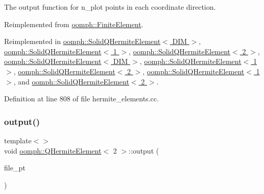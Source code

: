 The output function for n\+\_\+plot points in each coordinate direction. 



Reimplemented from \hyperlink{classoomph_1_1FiniteElement_afa9d9b2670f999b43e6679c9dd28c457}{oomph\+::\+Finite\+Element}.



Reimplemented in \hyperlink{classoomph_1_1SolidQHermiteElement_ade1e06d5bf37699c512cd91c013dd1e9}{oomph\+::\+Solid\+Q\+Hermite\+Element$<$ D\+I\+M $>$}, \hyperlink{classoomph_1_1SolidQHermiteElement_ade1e06d5bf37699c512cd91c013dd1e9}{oomph\+::\+Solid\+Q\+Hermite\+Element$<$ 1 $>$}, \hyperlink{classoomph_1_1SolidQHermiteElement_ade1e06d5bf37699c512cd91c013dd1e9}{oomph\+::\+Solid\+Q\+Hermite\+Element$<$ 2 $>$}, \hyperlink{classoomph_1_1SolidQHermiteElement_adef773329622efbbe113755da62a9cae}{oomph\+::\+Solid\+Q\+Hermite\+Element$<$ D\+I\+M $>$}, \hyperlink{classoomph_1_1SolidQHermiteElement_adef773329622efbbe113755da62a9cae}{oomph\+::\+Solid\+Q\+Hermite\+Element$<$ 1 $>$}, \hyperlink{classoomph_1_1SolidQHermiteElement_adef773329622efbbe113755da62a9cae}{oomph\+::\+Solid\+Q\+Hermite\+Element$<$ 2 $>$}, \hyperlink{classoomph_1_1SolidQHermiteElement_ab86bacc26f319f3266e6de9cfc5b82af}{oomph\+::\+Solid\+Q\+Hermite\+Element$<$ 1 $>$}, and \hyperlink{classoomph_1_1SolidQHermiteElement_ab86bacc26f319f3266e6de9cfc5b82af}{oomph\+::\+Solid\+Q\+Hermite\+Element$<$ 2 $>$}.



Definition at line 808 of file hermite\+\_\+elements.\+cc.

\mbox{\label{classoomph_1_1QHermiteElement_a38db955b7d2f3fddf170db5af57cb714}} 
\subsubsection{\texorpdfstring{output()}{output()}\hspace{0.1cm}{\footnotesize\ttfamily [11/12]}}
{\footnotesize\ttfamily template$<$$>$ \\
void \hyperlink{classoomph_1_1QHermiteElement}{oomph\+::\+Q\+Hermite\+Element}$<$ 2 $>$\+::output (\begin{DoxyParamCaption}\item[{F\+I\+LE $\ast$}]{file\+\_\+pt }\end{DoxyParamCaption})\hspace{0.3cm}{\ttfamily [virtual]}}



